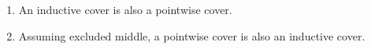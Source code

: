 %
\begin{thm} \label{inductive-cover-classical}
  \mbox{}
  \begin{enumerate}
  \item An inductive cover is also a pointwise cover.
  \item Assuming excluded middle, a pointwise cover is also an inductive cover.
  \end{enumerate}
\end{thm}

